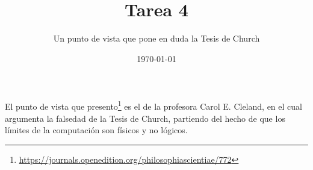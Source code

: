 \documentclass[11pt, a4paper, titlepage]{article}
\begin{document}
\title{Tarea 4}
\subtitle{Un punto de vista que pone en duda la Tesis de Church}
\date{\today}
\maketitle

El punto de vista que presento\footnote{\url{https://journals.openedition.org/philosophiascientiae/772}}
es el de la profesora Carol E. Cleland, en el cual argumenta la falsedad de la
Tesis de Church, partiendo del hecho de que los límites de la computación son físicos y no lógicos.
\newpage
\end{document}
